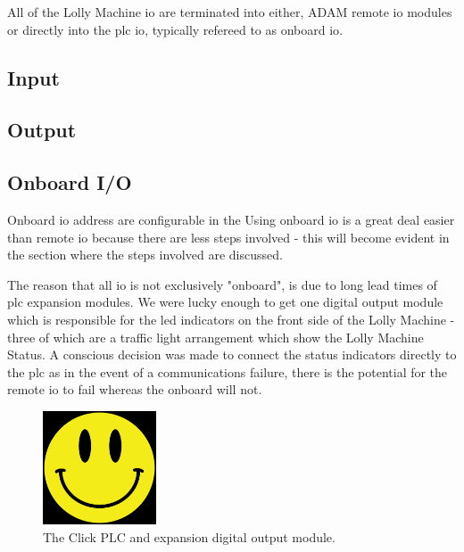     All of the Lolly Machine \acrshort{io} are terminated into either,  ADAM remote \acrshort{io} modules or directly into the \acrshort{plc} \acrshort{io}, typically refereed to as onboard \acrshort{io}.

    \subsection{Input} \label{sec:input}

    \subsection{Output} \label{sec:output}

    \subsection{Onboard I/O}
        Onboard \acrshort{io} address are configurable in the 
        Using onboard \acrshort{io} is a great deal easier than remote \acrshort{io} because there are less steps involved - this will become evident in the section where the steps involved are discussed. 
        
        The reason that all \acrshort{io} is not exclusively "onboard", is due to long lead times of \acrshort{plc} expansion modules. We were lucky enough to get one digital output module which is responsible for the \acrshort{led} indicators on the front side of the Lolly Machine - three of which are a traffic light arrangement which show the Lolly Machine Status. A conscious decision was made to connect the status indicators directly to the \acrshort{plc} as in the event of a communications failure, there is the potential for the remote \acrshort{io} to fail whereas the onboard will not. 

        \begin{figure}[H]
            \centering
            \includegraphics[width = 0.3\textwidth]{2_images/smile.png}
            \caption{The Click PLC and expansion digital output module.}
            \label{fig:plcIO}
        \end{figure}
        

